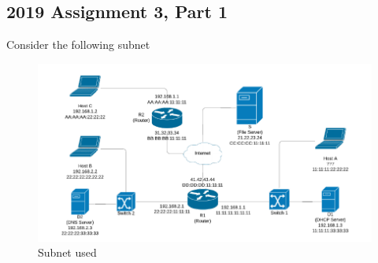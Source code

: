\documentclass{article}
\begin{document}
\subsection*{2019 Assignment 3, Part 1}

Consider the following subnet
\begin{figure}[H]
    \centering
    \includegraphics[scale=0.6]{images/arp_3.png}
    \caption{Subnet used}
\end{figure}
\end{document}
